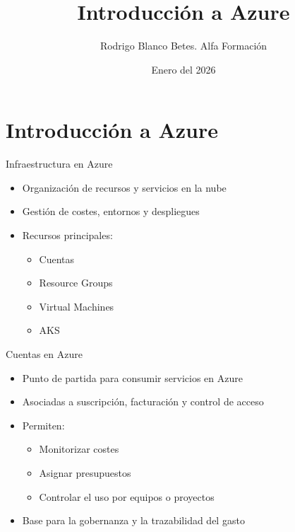 \documentclass{beamer}
\title{Introducción a Azure}
\author{Rodrigo Blanco Betes. Alfa Formación}
\date{Enero del 2026}
\begin{document}
\begin{frame}
\titlepage
\end{frame}

\begin{frame}
\tableofcontents
\end{frame}

\section{Introducción a Azure}

\begin{frame}{Infraestructura en Azure}
\begin{itemize}
    \item Organización de recursos y servicios en la nube
    \item Gestión de costes, entornos y despliegues
    \item Recursos principales:
    \begin{itemize}
        \item Cuentas
        \item Resource Groups
        \item Virtual Machines
        \item AKS
    \end{itemize}
\end{itemize}
\end{frame}

\begin{frame}{Cuentas en Azure}
\begin{itemize}
    \item Punto de partida para consumir servicios en Azure
    \item Asociadas a suscripción, facturación y control de acceso
    \item Permiten:
    \begin{itemize}
        \item Monitorizar costes
        \item Asignar presupuestos
        \item Controlar el uso por equipos o proyectos
    \end{itemize}
    \item Base para la gobernanza y la trazabilidad del gasto
\end{itemize}
\end{frame}
\end{document}
